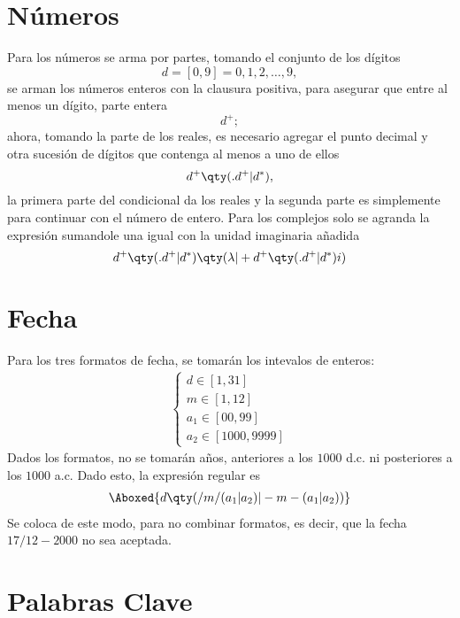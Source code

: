 \section{Números}
Para los números se arma por partes, tomando el conjunto de los dígitos
	$$d = [0,9] = {0,1,2,\ldots ,9},$$
se arman los números enteros con la clausura positiva, para asegurar que entre al menos un dígito, parte entera
	$$d^+;$$
ahora, tomando la parte de los reales, es necesario agregar el punto decimal y otra sucesión de dígitos que contenga al menos a uno de ellos
	$$d^+ \qty(.d^+ |d^*),$$
la primera parte del condicional da los reales y la segunda parte es simplemente para continuar con el número de entero. Para los complejos solo se agranda la expresión sumandole una igual con la unidad imaginaria añadida
	$$d^+ \qty(.d^+ |d^*) \qty(\lambda | + d^+ \qty(.d^+ |d^*)i)$$


\section{Fecha}
Para los tres formatos de fecha, se tomarán los intevalos de enteros:
\begin{align*}
	\left\{\begin{array}{c}
		d \in [1,31] \\
		m \in [1,12] \\
		a_1 \in [00,99] \\
		a_2 \in [1000,9999]
	\end{array}\right.
\end{align*}
Dados los formatos, no se tomarán años, anteriores a los $1000$ d.c. ni posteriores a los $1000$ a.c. Dado esto, la expresión regular es
\begin{align*}
	\Aboxed{d\qty(/m/(a_1|a_2)|-m-(a_1|a_2))}
\end{align*}
Se coloca de este modo, para no combinar formatos, es decir, que la fecha $17/12-2000$ no sea aceptada.

\section{Palabras Clave}